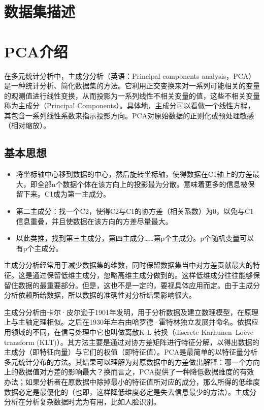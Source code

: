 \documentclass{HEBUTMaster}   %
\begin{document}
\chapter{数据集描述}


\chapter{PCA介绍}
在多元统计分析中，主成分分析（英语：Principal components analysis，PCA）是一种统计分析、简化数据集的方法。它利用正交变换来对一系列可能相关的变量的观测值进行线性变换，从而投影为一系列线性不相关变量的值，这些不相关变量称为主成分（Principal Components）。具体地，主成分可以看做一个线性方程，其包含一系列线性系数来指示投影方向。PCA对原始数据的正则化或预处理敏感（相对缩放）。

\section{基本思想}
\begin{itemize}
  \item  将坐标轴中心移到数据的中心，然后旋转坐标轴，使得数据在C1轴上的方差最大，即全部n个数据个体在该方向上的投影最为分散。意味着更多的信息被保留下来。C1成为第一主成分。
  \item 第二主成分：找一个C2，使得C2与C1的协方差（相关系数）为0，以免与C1信息重叠，并且使数据在该方向的方差尽量最大。
  \item  以此类推，找到第三主成分，第四主成分……第p个主成分。p个随机变量可以有p个主成分。
\end{itemize}

主成分分析经常用于减少数据集的维数，同时保留数据集当中对方差贡献最大的特征。这是通过保留低维主成分，忽略高维主成分做到的。这样低维成分往往能够保留住数据的最重要部分。但是，这也不是一定的，要视具体应用而定。由于主成分分析依赖所给数据，所以数据的准确性对分析结果影响很大。

主成分分析由卡尔·皮尔逊于1901年发明，用于分析数据及建立数理模型，在原理上与主轴定理相似。之后在1930年左右由哈罗德·霍特林独立发展并命名。依据应用领域的不同，在信号处理中它也叫做离散K-L 转换（discrete Karhunen–Loève transform (KLT)）。其方法主要是通过对协方差矩阵进行特征分解，以得出数据的主成分（即特征向量）与它们的权值（即特征值）。PCA是最简单的以特征量分析多元统计分布的方法。其结果可以理解为对原数据中的方差做出解释：哪一个方向上的数据值对方差的影响最大？换而言之，PCA提供了一种降低数据维度的有效办法；如果分析者在原数据中除掉最小的特征值所对应的成分，那么所得的低维度数据必定是最優化的（也即，这样降低维度必定是失去信息最少的方法）。主成分分析在分析复杂数据时尤为有用，比如人脸识别。
\end{document}
